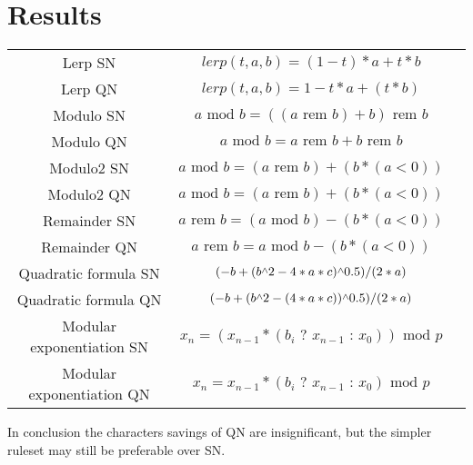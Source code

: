 \documentclass[twoside]{article}
\newcommand{\T}[1]{\textrm{#1}} %
\newcommand{\caret}{\raisebox{0.5ex}{$\scriptstyle\wedge$}}
\newcommand{\rem}{\T{ rem }}
\newcommand{\mod}{\T{ mod }}
\newcommand{\ifelse}[3]{#1\T{ ? }#2\T{ : }#3}
\begin{document}
    \section{Results}
        \begin{center}
        \begin{tabular}{ccc}
            \hline
            Lerp SN & $ lerp(t, a, b) = (1 - t) * a + t * b $\\
            Lerp QN & $ lerp(t, a, b) = 1 - t * a + (t * b) $\\
            Modulo SN & $ a \mod b = ((a \rem b) + b) \rem b $\\
            Modulo QN & $ a \mod b = a \rem b + b \rem b $\\
            Modulo2 SN & $ a \mod b = (a \rem b) + (b * (a < 0)) $\\
            Modulo2 QN & $ a \mod b = (a \rem b) + (b * (a < 0)) $\\
            Remainder SN & $ a \rem b = (a \mod b) - (b * (a < 0)) $\\
            Remainder QN & $ a \rem b = a \mod b - (b * (a < 0)) $\\
            Quadratic formula SN & $ (-b + (b \caret 2 - 4 * a * c) \caret 0.5) / (2 * a) $\\
            Quadratic formula QN & $ (-b + (b \caret 2 - (4 * a * c)) \caret 0.5) / (2 * a) $\\
            Modular exponentiation SN & $ x_n = (x_{n-1} * (\ifelse{b_i}{x_{n-1}}{x_0})) \mod p$\\
            Modular exponentiation QN & $ x_n = x_{n-1} * (\ifelse{b_i}{x_{n-1}}{x_0}) \mod p$\\
            \hline
        \end{tabular}
        \end{center}
        \par\vspace{5px}
            In conclusion the characters savings of QN are insignificant,
            but the simpler ruleset may still be preferable over SN.
\end{document}

